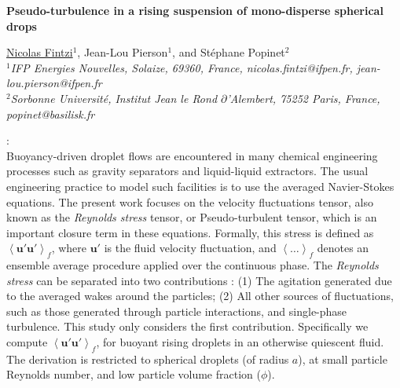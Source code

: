 \documentclass[12pt,a4paper]{article}
\newcommand{\avg}[1]{\left<#1\right>}
\renewcommand{\avg}[1]{\left<#1\right>}
\begin{document}
\pagestyle{fancy}
\fancyhf{}

\lhead{\textcolor{mygray}{12th International Conference on Multiphase flow}}
\rhead{\textcolor{mygray}{ICMF 2025, Toulouse, France, May 12-16, 2025}}
\lfoot{}
\cfoot{}
\rfoot{}

\begin{center}
{\large {\bf Pseudo-turbulence in a rising suspension of mono-disperse spherical drops}}
\vspace{10pt}


\underline{Nicolas Fintzi}$^1$, Jean-Lou Pierson$^1$, and St\'ephane Popinet$^2$\\
{\it
$^1$IFP Energies Nouvelles, Solaize, 69360, France, nicolas.fintzi@ifpen.fr, jean-lou.pierson@ifpen.fr\\
$^2$Sorbonne Universit\'e, Institut Jean le Rond $\partial$'Alembert, 75252 Paris, France, popinet@basilisk.fr\\
}
\end{center}

\vspace{10pt}
:\\
Buoyancy-driven droplet flows are encountered in many chemical engineering processes such as gravity separators and liquid-liquid extractors. 
The usual engineering practice to model such facilities is to use the averaged Navier-Stokes equations. 
The present work focuses on the velocity fluctuations tensor, also known as the \textit{Reynolds stress} tensor, or Pseudo-turbulent tensor, which is an important closure term in these equations.
Formally, this stress is defined as $\avg{ \textbf{u}' \textbf{u}'}_f$, where $\textbf{u}'$ is the fluid velocity fluctuation, and $\avg{\ldots}_f$ denotes an ensemble average procedure applied over the continuous phase. 
The \textit{Reynolds stress} can be separated into two contributions : (1) The agitation generated due to the averaged wakes around the particles; (2) All other sources of fluctuations, such as those generated through particle interactions, and single-phase turbulence. %
This study only considers the first contribution. 
Specifically we compute $\avg{ \textbf{u}' \textbf{u}'}_f$, for buoyant rising droplets in an otherwise quiescent fluid. 
The derivation is restricted to spherical droplets (of radius $a$), at small particle Reynolds number, and low particle volume fraction ($\phi$). 
    \vspace{10pt}
\end{document}
